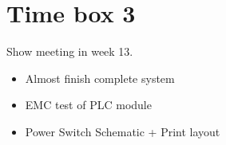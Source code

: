 \section{Time box 3}
Show meeting in week 13.
\begin{itemize}
	\item Almost finish complete system
	\item EMC test of PLC module
	\item Power Switch Schematic + Print layout
\end{itemize}